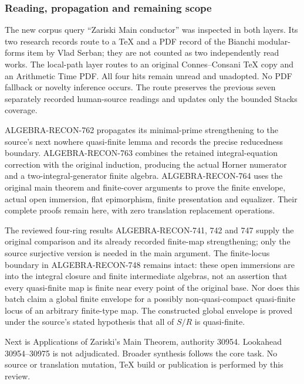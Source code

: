 \subsubsection{Reading, propagation and remaining scope}\label{algebra-proof-032-reading-propagation-and-remaining-scope}

The new corpus query ``Zariski Main conductor'' was inspected in both layers. Its two research records route to a TeX and a PDF record of the Bianchi modular-forms item by Vlad Serban; they are not counted as two independently read works. The local-path layer routes to an original Connes--Consani TeX copy and an Arithmetic Time PDF. All four hits remain unread and unadopted. No PDF fallback or novelty inference occurs. The route preserves the previous seven separately recorded human-source readings and updates only the bounded Stacks coverage.

ALGEBRA-RECON-762 propagates its minimal-prime strengthening to the source's next nowhere quasi-finite lemma and records the precise reducedness boundary. ALGEBRA-RECON-763 combines the retained integral-equation correction with the original induction, producing the actual Horner numerator and a two-integral-generator finite algebra. ALGEBRA-RECON-764 uses the original main theorem and finite-cover arguments to prove the finite envelope, actual open immersion, flat epimorphism, finite presentation and equalizer. Their complete proofs remain here, with zero translation replacement operations.

The reviewed four-ring results ALGEBRA-RECON-741, 742 and 747 supply the original comparison and its already recorded finite-map strengthening; only the source surjective version is needed in the main argument. The finite-locus boundary in ALGEBRA-RECON-748 remains intact: these open immersions are into the integral closure and finite intermediate algebras, not an assertion that every quasi-finite map is finite near every point of the original base. Nor does this batch claim a global finite envelope for a possibly non-quasi-compact quasi-finite locus of an arbitrary finite-type map. The constructed global envelope is proved under the source's stated hypothesis that all of \(S/R\) is quasi-finite.

Next is Applications of Zariski's Main Theorem, authority 30954. Lookahead 30954--30975 is not adjudicated. Broader synthesis follows the core task. No source or translation mutation, TeX build or publication is performed by this review.
